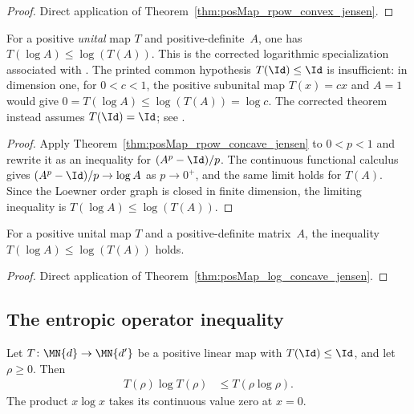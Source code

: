 \begin{proof}\leanok
    Direct application of Theorem~\ref{thm:posMap_rpow_convex_jensen}.
\end{proof}

\begin{theorem}\label{thm:posMap_log_concave_jensen}
    \leanok
    For a positive \emph{unital} map $T$ and positive-definite~$A$, one has
    $T(\log A)\le\log(T(A))$.
    This is the corrected logarithmic specialization associated with
    \cite[Corollary~5.2(3)]{Wolf2012Quantum}.  The printed common hypothesis
    $T(\Id)\le\Id$ is insufficient: in dimension one, for $0<c<1$, the
    positive subunital map $T(x)=cx$ and $A=1$ would give
    $0=T(\log A)\le\log(T(A))=\log c$.  The corrected theorem instead assumes
    $T(\Id)=\Id$; see \cite{gap:wolf_ch5_operator_jensen_lieb}.
\end{theorem}

\begin{proof}\leanok
    Apply Theorem~\ref{thm:posMap_rpow_concave_jensen} to $0<p<1$ and rewrite
    it as an inequality for $(A^p-\Id)/p$. The continuous functional calculus
    gives $(A^p-\Id)/p\to\log A$ as $p\to0^+$, and the same limit holds for
    $T(A)$. Since the Loewner order graph is closed in finite dimension, the
    limiting inequality is $T(\log A)\le\log(T(A))$.
\end{proof}

\begin{theorem}\label{thm:log_concave_jensen}
    \leanok
    For a positive unital map $T$ and a positive-definite matrix~$A$,
    the inequality $T(\log A)\le\log(T(A))$ holds.
\end{theorem}

\begin{proof}\leanok
    Direct application of Theorem~\ref{thm:posMap_log_concave_jensen}.
\end{proof}

\subsection{The entropic operator inequality}

\begin{theorem}
    \label{thm:entropic_jensen_subunital}
    \leanok
    Let $T\colon\MN{d}\to\MN{d'}$ be a positive linear map with
    $T(\Id)\le\Id$, and let $\rho\ge0$. Then
    \begin{align}
        T(\rho)\log T(\rho)&\le T(\rho\log\rho).
        \label{eq:entropic_jensen}
    \end{align}
    The product $x\log x$ takes its continuous value zero at $x=0$.
\end{theorem}

